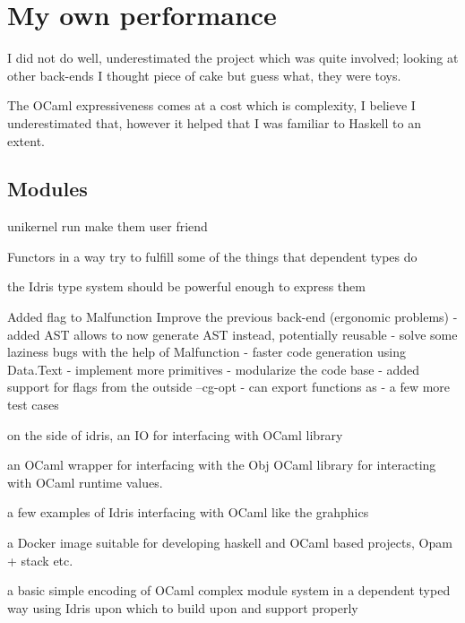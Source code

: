 

\section{My own performance}
I did not do well, underestimated the project
which was quite involved; looking at other back-ends 
I thought piece of cake but guess what, they were
toys. 

The OCaml expressiveness comes at a cost which is complexity,
I believe I underestimated that, however it helped that
I was familiar to Haskell to an extent. 


\subsection{Modules}
unikernel run
make them user friend

Functors in a way try to fulfill some of the things that
dependent types do


the Idris type system should be powerful enough to express them

Added flag to Malfunction
Improve the previous back-end  (ergonomic problems)
- added AST allows to now generate AST instead, potentially reusable
- solve some laziness bugs with the help of Malfunction
- faster code generation using Data.Text
- implement more primitives
- modularize the code base
- added support for flags from the outside --cg-opt
- can export functions as
- a few more test cases

on the side of idris, an IO for interfacing with OCaml library

an OCaml wrapper for interfacing with the Obj OCaml library for
interacting with OCaml runtime values.

a few examples of Idris interfacing with OCaml like the
grahphics

a Docker image suitable for developing haskell and OCaml
based projects, Opam + stack etc.

a basic simple encoding of OCaml complex module system in
a dependent typed way using Idris upon which to build
upon and support properly
